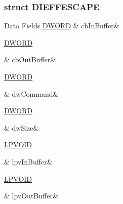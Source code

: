 \subsubsection{struct D\-I\-E\-F\-F\-E\-S\-C\-A\-P\-E}
\begin{DoxyFields}{Data Fields}
\hypertarget{a00003_a154a0518b084fff4c66d8681cbdb23ed}{\hyperlink{a00003_a50e15ae51c87ae06ab29c8148cb5f36c}{D\-W\-O\-R\-D}}\label{a00003_a154a0518b084fff4c66d8681cbdb23ed}
&
cb\-In\-Buffer&
\\
\hline

\hypertarget{a00003_af5f9476202f79af43fdd352f910f8eab}{\hyperlink{a00003_a50e15ae51c87ae06ab29c8148cb5f36c}{D\-W\-O\-R\-D}}\label{a00003_af5f9476202f79af43fdd352f910f8eab}
&
cb\-Out\-Buffer&
\\
\hline

\hypertarget{a00003_a86724ebbcd6f909422e2bb99dadaee29}{\hyperlink{a00003_a50e15ae51c87ae06ab29c8148cb5f36c}{D\-W\-O\-R\-D}}\label{a00003_a86724ebbcd6f909422e2bb99dadaee29}
&
dw\-Command&
\\
\hline

\hypertarget{a00003_a669c5a85f5a9eb97e64ad880fadaaa2d}{\hyperlink{a00003_a50e15ae51c87ae06ab29c8148cb5f36c}{D\-W\-O\-R\-D}}\label{a00003_a669c5a85f5a9eb97e64ad880fadaaa2d}
&
dw\-Size&
\\
\hline

\hypertarget{a00003_af460e3b5abfab6f3fa87a8ede67a2053}{\hyperlink{a00003_ae611cd6871649dbfe37273a0253d5e61}{L\-P\-V\-O\-I\-D}}\label{a00003_af460e3b5abfab6f3fa87a8ede67a2053}
&
lpv\-In\-Buffer&
\\
\hline

\hypertarget{a00003_ada548391e365516430e666bb84be9afe}{\hyperlink{a00003_ae611cd6871649dbfe37273a0253d5e61}{L\-P\-V\-O\-I\-D}}\label{a00003_ada548391e365516430e666bb84be9afe}
&
lpv\-Out\-Buffer&
\\
\hline

\end{DoxyFields}
\label{d1/d1e/a00087}
\hypertarget{a00003_d1/d1e/a00087}{}
